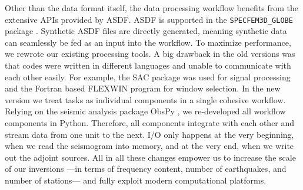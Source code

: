 Other than the data format itself, the data processing workflow benefits from the extensive
APIs provided by ASDF. ASDF is supported in the \texttt{SPECFEM3D\_GLOBE}
package \cite{KoTr02a}. Synthetic ASDF files are
directly generated, meaning synthetic data can seamlessly be fed as an input
into the workflow. To maximize performance, we rewrote our existing processing
tools. A big drawback in the old versions was that codes were written in
different languages and unable to communicate with each other easily. For
example, the SAC package was used for
signal processing and the Fortran based FLEXWIN program \cite{maggi2009automated} for
window selection.
In the new version we treat tasks as individual components in a single cohesive
workflow. Relying on the seismic analysis package ObsPy \cite{obspy2010}, we
re-developed all workflow components in Python. Therefore, all components
integrate with each other and stream data from one unit to the next. I/O only
happens at the very beginning, when we read the seismogram into memory, and at
the very end, when we write out the adjoint sources. All in all these changes
empower us to increase the scale of our inversions ---in terms of frequency
content, number of earthquakes, and number of stations--- and fully exploit
modern computational platforms.
